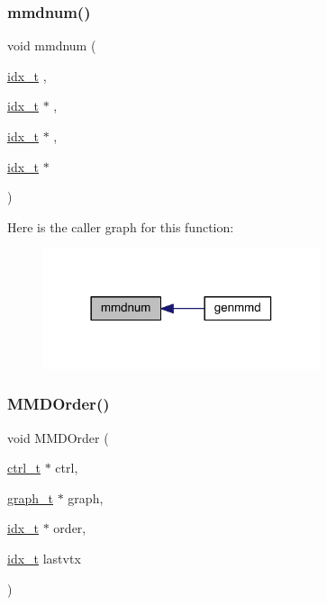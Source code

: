 \subsubsection{\texorpdfstring{mmdnum()}{mmdnum()}}
{\footnotesize\ttfamily void mmdnum (\begin{DoxyParamCaption}\item[{\hyperlink{a00876_aaa5262be3e700770163401acb0150f52}{idx\+\_\+t}}]{,  }\item[{\hyperlink{a00876_aaa5262be3e700770163401acb0150f52}{idx\+\_\+t} $\ast$}]{,  }\item[{\hyperlink{a00876_aaa5262be3e700770163401acb0150f52}{idx\+\_\+t} $\ast$}]{,  }\item[{\hyperlink{a00876_aaa5262be3e700770163401acb0150f52}{idx\+\_\+t} $\ast$}]{ }\end{DoxyParamCaption})}

Here is the caller graph for this function\+:\nopagebreak
\begin{figure}[H]
\begin{center}
\leavevmode
\includegraphics[width=230pt]{a00945_ae090e63169c49463225ff0c4704af93f_icgraph}
\end{center}
\end{figure}
\mbox{\label{a00945_acafb70c0e49cde8105dc62f6c34dfa6c}} 
\subsubsection{\texorpdfstring{M\+M\+D\+Order()}{MMDOrder()}}
{\footnotesize\ttfamily void M\+M\+D\+Order (\begin{DoxyParamCaption}\item[{\hyperlink{a00742}{ctrl\+\_\+t} $\ast$}]{ctrl,  }\item[{\hyperlink{a00734}{graph\+\_\+t} $\ast$}]{graph,  }\item[{\hyperlink{a00876_aaa5262be3e700770163401acb0150f52}{idx\+\_\+t} $\ast$}]{order,  }\item[{\hyperlink{a00876_aaa5262be3e700770163401acb0150f52}{idx\+\_\+t}}]{lastvtx }\end{DoxyParamCaption})}

